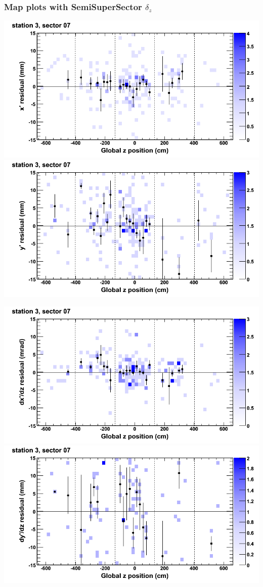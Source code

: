 \documentclass[compress]{beamer}
\begin{document}
\begin{frame}
\frametitle{Map plots with SemiSuperSector $\delta_z$}
\includegraphics[width=0.5\linewidth]{zfit_mapplots/DTvsz_st3sec07_x.png}
\includegraphics[width=0.5\linewidth]{zfit_mapplots/DTvsz_st3sec07_y.png}

\includegraphics[width=0.5\linewidth]{zfit_mapplots/DTvsz_st3sec07_dxdz.png}
\includegraphics[width=0.5\linewidth]{zfit_mapplots/DTvsz_st3sec07_dydz.png}
\end{frame}
\end{document}
